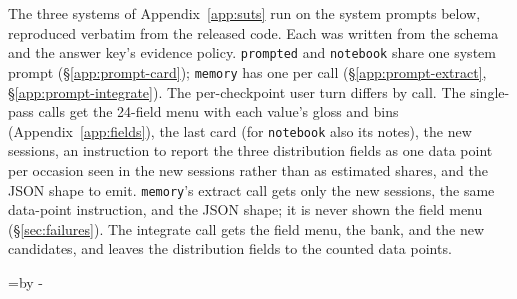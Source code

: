 \documentclass{article}
\makeatletter
\newcommand{\Needspace}[1]{\par\begingroup\@tempdima=\pagegoal\advance\@tempdima by -\pagetotal
  \ifdim\@tempdima<#1\relax\newpage\fi\endgroup}  %
\makeatother
\begin{document}
The three systems of Appendix~\ref{app:suts} run on the system prompts below, reproduced verbatim
from the released code. Each was
written from the schema and the answer key's evidence policy. \texttt{prompted} and \texttt{notebook} share one system prompt
(\S\ref{app:prompt-card}); \texttt{memory} has one per call (\S\ref{app:prompt-extract},
\S\ref{app:prompt-integrate}). The per-checkpoint user turn differs by call. The single-pass calls
get the 24-field menu with each value's gloss and bins (Appendix~\ref{app:fields}), the last card
(for \texttt{notebook} also its notes), the new sessions, an instruction to report the three
distribution fields as one data point per occasion seen in the new sessions rather than as estimated
shares, and the JSON shape to emit. \texttt{memory}'s extract call gets only the new sessions, the
same data-point instruction, and the JSON shape; it is never shown the field menu
(\S\ref{sec:failures}). The integrate call gets the field menu, the bank, and the new candidates, and leaves the
distribution fields to the counted data points.

\Needspace{8\baselineskip}
\end{document}
